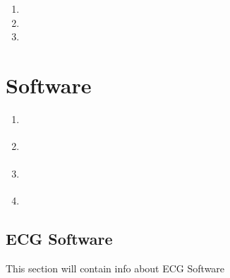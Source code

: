 \documentclass[a4paper,10pt,english,oneside]{sphinxmanual}
\begin{document}
\subsection{}
\label{\detokenize{applications/index:id9}}\begin{enumerate}
%
\item {} 
\sphinxAtStartPar
{}

\item {} 
\sphinxAtStartPar
{}

\item {} 
\sphinxAtStartPar
{}

\end{enumerate}

\sphinxstepscope


\chapter{Software}
\label{\detokenize{software/index:software}}\label{\detokenize{software/index::doc}}\begin{enumerate}
%
\item {} 
\sphinxAtStartPar
{\hyperref[\detokenize{software/index:open20}]{}}

\item {} 
\sphinxAtStartPar
{\hyperref[\detokenize{software/index:open21}]{}}

\item {} 
\sphinxAtStartPar
{\hyperref[\detokenize{software/index:open22}]{}}

\item {} 
\sphinxAtStartPar
{\hyperref[\detokenize{software/index:open23}]{}}

\end{enumerate}

\begin{DUlineblock}{0em}
\item[] 
\end{DUlineblock}


\section{ECG Software}
\label{\detokenize{software/index:ecg-software}}\label{\detokenize{software/index:open20}}
\sphinxAtStartPar
This section will contain info about ECG Software
\end{document}
